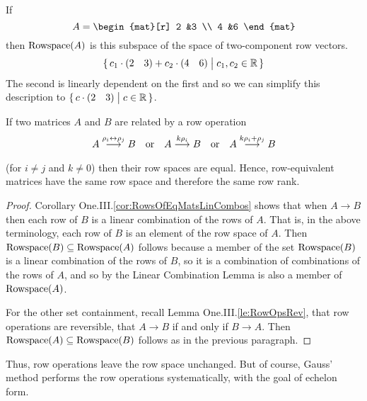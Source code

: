 \begin{example}
If
\begin{equation*}
  A=\begin{mat}[r]
          2  &3  \\
          4  &6
       \end{mat}
\end{equation*}
then \( \mathop{{\mbox{Rowspace}}}(A) \) is this subspace of the space of
two-component row vectors.
\begin{equation*}
   \mbox{$\{\,c_1\cdot(\begin{matrix} 2 &3 \end{matrix})+c_2\cdot(\begin{matrix} 4  &6 \end{matrix})
          \bigm| c_1,c_2\in\mathbb{R} \,\}$}
\end{equation*}
The second is linearly dependent on the first and so we can
simplify this description to 
$\mbox{$\{\,c\cdot(\begin{matrix} 2 &3 \end{matrix})\bigm| c\in\mathbb{R} \,\}$}$.
\end{example}

\begin{lemma}     \label{le:RowSpUnchByGR}
If two matrices \( A \) and \( B \) are related by a row operation
\begin{equation*}
  A\mathrel{ \mathop{\longrightarrow}\limits^{\rho_i\leftrightarrow\rho_j\mathstrut}_{ \begin{subarray}{l} \relax \end{subarray}}}B 
  \quad\text{or}\quad
  A\mathrel{ \mathop{\longrightarrow}\limits^{k\rho_i\mathstrut}_{ \begin{subarray}{l} \relax \end{subarray}}}B 
  \quad\text{or}\quad
  A\mathrel{ \mathop{\longrightarrow}\limits^{k\rho_i+\rho_j\mathstrut}_{ \begin{subarray}{l} \relax \end{subarray}}}B
\end{equation*}
(for $i\neq j$ and $k\neq 0$) then their row spaces are equal.
Hence, row-equivalent matrices have the same row space and therefore
the same row rank.
\end{lemma}

\begin{proof}
Corollary One.III.\ref{cor:RowsOfEqMatsLinCombos} 
shows that when \mbox{$A\longrightarrow B$} then each row of $B$
is a linear combination of the rows of \( A \).
That is, in the above terminology, each row of \( B \) 
is an element of the row space of $A$.
Then $\mathop{{\mbox{Rowspace}}}(B)\subseteq\mathop{{\mbox{Rowspace}}}(A)$ follows because a member of the
set $\mathop{{\mbox{Rowspace}}}(B)$ is a linear combination of the rows of $B$, so it
is a combination of combinations of the rows of $A$,
and so by the Linear Combination Lemma is also a member of $\mathop{{\mbox{Rowspace}}}(A)$.

For the other set containment, 
recall Lemma One.III.\ref{le:RowOpsRev}, that row operations are reversible,
that 
\mbox{$A\longrightarrow B$} if and only if
\mbox{$B\longrightarrow A$}.
Then 
$\mathop{{\mbox{Rowspace}}}(A)\subseteq\mathop{{\mbox{Rowspace}}}(B)$ follows as in the previous paragraph. 
\end{proof}

Thus, row operations leave the row space unchanged.
But of course, Gauss' method performs the row operations systematically,
with the goal of echelon form.


